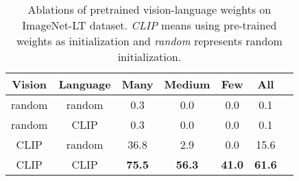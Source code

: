 \documentclass[10pt,twocolumn,letterpaper]{article}
\begin{document}
\begin{table}[t!]
    \centering
    \small
\begin{tabular}{lllllll}
    \toprule
         \multicolumn{1}{c|}{Vision}  &\multicolumn{1}{c|}{Language} &\multicolumn{1}{c}{Many} &\multicolumn{1}{c}{Medium} &\multicolumn{1}{c}{Few} &\multicolumn{1}{c}{All}\\ \midrule
         \multicolumn{1}{c|}{random}  &\multicolumn{1}{c|}{random} &\multicolumn{1}{c}{0.3} &\multicolumn{1}{c}{0.0} &\multicolumn{1}{c}{0.0} &\multicolumn{1}{c}{0.1}\\
         \multicolumn{1}{c|}{random}  &\multicolumn{1}{c|}{CLIP} &\multicolumn{1}{c}{0.3} &\multicolumn{1}{c}{0.0} &\multicolumn{1}{c}{0.0} &\multicolumn{1}{c}{0.1}\\
         \multicolumn{1}{c|}{CLIP}  &\multicolumn{1}{c|}{random} &\multicolumn{1}{c}{36.8} &\multicolumn{1}{c}{2.9} &\multicolumn{1}{c}{0.0} &\multicolumn{1}{c}{15.6}\\ 
         \multicolumn{1}{c|}{CLIP}  &\multicolumn{1}{c|}{CLIP} &\multicolumn{1}{c}{\bf 75.5} &\multicolumn{1}{c}{\bf 56.3} &\multicolumn{1}{c}{\bf 41.0} &\multicolumn{1}{c}{\textbf{61.6}}\\ 
    \bottomrule
    \end{tabular}
    \caption{Ablations of pretrained vision-language weights on ImageNet-LT dataset. \textit{CLIP} means using pre-trained weights as initialization and \textit{random} represents random initialization.}
    \label{tab: pretrain}
    \vspace{-6pt}
\end{table}
\end{document}
